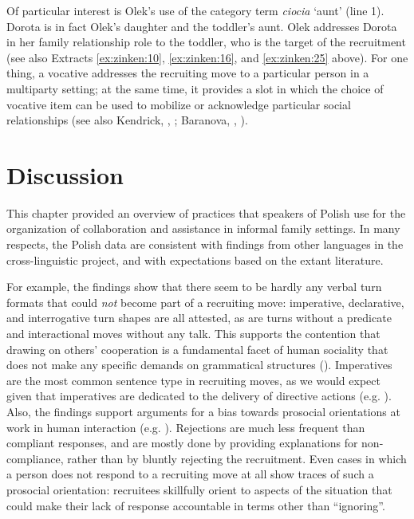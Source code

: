 \documentclass[output=paper]{langsci/langscibook}
\begin{document}
Of particular interest is Olek’s use of the category term \textit{ciocia} `aunt' (line 1).  Dorota is in fact Olek’s daughter and the toddler’s aunt.  Olek addresses Dorota in her family relationship role to the toddler, who is the target of the recruitment (see also Extracts \ref{ex:zinken:10}, \ref{ex:zinken:16}, and \ref{ex:zinken:25} above).  For one thing, a vocative addresses the recruiting move to a particular person in a multiparty setting; at the same time, it provides a slot in which the choice of vocative item can be used to mobilize or acknowledge particular social relationships (see also Kendrick, , ; Baranova, , ).

\section{Discussion}

This chapter provided an overview of practices that speakers of Polish use for the organization of collaboration and assistance in informal family settings.  In many respects, the Polish data are consistent with findings from other languages in the cross-linguistic project, and with expectations based on the extant literature.

For example, the findings show that there seem to be hardly any verbal turn formats that could \textit{not} become part of a recruiting move: imperative, declarative, and interrogative turn shapes are all attested, as are turns without a predicate and interactional moves without any talk.  This supports the contention that drawing on others’ cooperation is a fundamental facet of human sociality that does not make any specific demands on grammatical structures (\citealt{Tomasello2008}).  Imperatives are the most common sentence type in recruiting moves, as we would expect given that imperatives are dedicated to the delivery of directive actions (e.g. \citealt{aikhenvald2010}).  Also, the findings support arguments for a bias towards prosocial orientations at work in human interaction (e.g. \citealt{heritage1984garfinkel}).  Rejections are much less frequent than compliant responses, and are mostly done by providing explanations for non-compliance, rather than by bluntly rejecting the recruitment.  Even cases in which a person does not respond to a recruiting move at all show traces of such a prosocial orientation: recruitees skillfully orient to aspects of the situation that could make their lack of response accountable in terms other than ``ignoring''.
\end{document}
